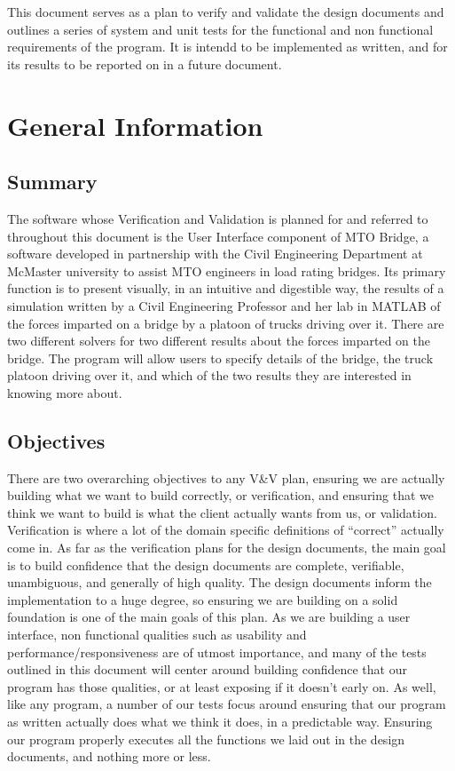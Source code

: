 \documentclass[12pt, titlepage]{article}
\begin{document}

This document serves as a plan to verify and validate the design documents and outlines a series of system and unit tests for the functional and non functional requirements
of the program. It is intendd to be implemented as written, and for its results to be reported on in a future document.

\section{General Information}

\subsection{Summary}

The software whose Verification and Validation is planned for and referred to throughout this document is the User Interface component of MTO Bridge, 
a software developed in partnership with the Civil Engineering Department at McMaster university to assist MTO engineers in load rating bridges.
Its primary function is to present visually, in an intuitive and digestible way, the results of a simulation written by a Civil Engineering Professor and her lab 
in MATLAB of the forces imparted on a bridge by a platoon of trucks driving over it. There are two different solvers for two different results about the forces 
imparted on the bridge. The program will allow users to specify details of the bridge, the truck platoon driving over it, and which of the two results they are 
interested in knowing more about.\\ 

\subsection{Objectives}

There are two overarching objectives to any V\&V plan, ensuring we are actually building what we want to build correctly, or verification,
and ensuring that we think we want to build is what the client actually wants from us, or validation. Verification is where a lot of the domain specific definitions
of “correct” actually come in. As far as the verification plans for the design documents, the main goal is to build confidence that the design documents are complete,
verifiable, unambiguous, and generally of high quality. The design documents inform the implementation to a huge degree, so ensuring we are building on a solid foundation
is one of the main goals of this plan. As we are building a user interface, non functional qualities such as usability and performance/responsiveness are of 
utmost importance, and many of the tests outlined in this document will center around building confidence that our program has those qualities, or at least 
exposing if it doesn’t early on. As well, like any program, a number of our tests focus around ensuring that our program as written actually does what we think it does,
in a predictable way. Ensuring our program properly executes all the functions we laid out in the design documents, and nothing more or less.\\
\end{document}
